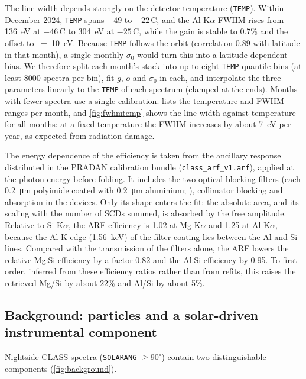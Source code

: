 The line width depends strongly on the detector temperature (\texttt{TEMP}). Within December 2024, \texttt{TEMP} spans $-49$ to $-22$\,\textdegree C, and the Al K$\alpha$ FWHM rises from \SI{136}{eV} at $-46$\,\textdegree C to \SI{304}{eV} at $-25$\,\textdegree C, while the gain is stable to 0.7\% and the offset to \SI{\pm10}{eV}. Because \texttt{TEMP} follows the orbit (correlation 0.89 with latitude in that month), a single monthly $\sigma_0$ would turn this into a latitude-dependent bias. We therefore split each month's stack into up to eight \texttt{TEMP} quantile bins (at least 8000 spectra per bin), fit $g$, $o$ and $\sigma_0$ in each, and interpolate the three parameters linearly to the \texttt{TEMP} of each spectrum (clamped at the ends). Months with fewer spectra use a single calibration.  lists the temperature and FWHM ranges per month, and \cref{fig:fwhmtemp} shows the line width against temperature for all months: at a fixed temperature the FWHM increases by about \SI{7}{eV} per year, as expected from radiation damage.

The energy dependence of the efficiency is taken from the ancillary response distributed in the PRADAN calibration bundle (\texttt{class\_arf\_v1.arf}), applied at the photon energy before folding. It includes the two optical-blocking filters (each \SI{0.2}{\micro m} polyimide coated with \SI{0.2}{\micro m} aluminium; \citealp{Radhakrishna2020,Pillai2021}), collimator blocking and absorption in the devices. Only its shape enters the fit: the absolute area, and its scaling with the number of SCDs summed, is absorbed by the free amplitude. Relative to Si K$\alpha$, the ARF efficiency is 1.02 at Mg K$\alpha$ and 1.25 at Al K$\alpha$, because the Al K edge (\SI{1.56}{keV}) of the filter coating lies between the Al and Si lines. Compared with the transmission of the filters alone, the ARF lowers the relative Mg:Si efficiency by a factor 0.82 and the Al:Si efficiency by 0.95. To first order, inferred from these efficiency ratios rather than from refits, this raises the retrieved Mg/Si by about 22\% and Al/Si by about 5\%.

\subsection{Background: particles and a solar-driven instrumental component}\label{sec:background}
Nightside CLASS spectra (\texttt{SOLARANG} $\geq 90^\circ$) contain two distinguishable components (\cref{fig:background}).

